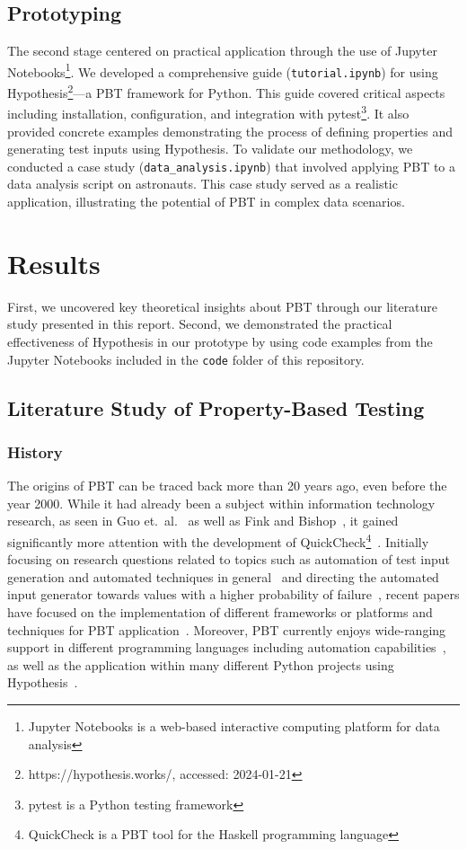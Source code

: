 \documentclass[runningheads]{llncs}
\begin{document}
\subsection{Prototyping}
The second stage centered on practical application through the use of Jupyter Notebooks\footnote{Jupyter Notebooks is a web-based interactive computing platform for data analysis}. We developed a comprehensive guide (\texttt{tutorial.ipynb}) for using Hypothesis\footnote{https://hypothesis.works/, accessed: 2024-01-21}---a PBT framework for Python. This guide covered critical aspects including installation, configuration, and integration with pytest\footnote{pytest is a Python testing framework}. It also provided concrete examples demonstrating the process of defining properties and generating test inputs using Hypothesis. To validate our methodology, we conducted a case study (\texttt{data\_analysis.ipynb}) that involved applying PBT to a data analysis script on astronauts. This case study served as a realistic application, illustrating the potential of PBT in complex data scenarios.

\section{Results}
First, we uncovered key theoretical insights about PBT through our literature study presented in this report. Second, we demonstrated the practical effectiveness of Hypothesis in our prototype by using code examples from the Jupyter Notebooks included in the \texttt{code} folder of this repository.

\subsection{Literature Study of Property-Based Testing}
\subsubsection{History}
The origins of PBT can be traced back more than 20 years ago, even before the year 2000. While it had already been a subject within information technology research, as seen in Guo et.~al.~\cite{Guo1999} as well as Fink and Bishop~\cite{Fink1997}, it gained significantly more attention with the development of QuickCheck\footnote{QuickCheck is a PBT tool for the Haskell programming language}~\cite{Shi2023,Guo1999,Fink1997,MacIver2019,Honarvar2020}. Initially focusing on research questions related to topics such as automation of test input generation and automated techniques in general~\cite{Fink1997} and directing the automated input generator towards values with a higher probability of failure~\cite{Loescher2017}, recent papers have focused on the implementation of different frameworks or platforms and techniques for PBT application~\cite{Padhye2019,Honarvar2020,Shi2023,Corgozinho2023}. Moreover, PBT currently enjoys wide-ranging support in different programming languages including automation capabilities~\cite{Chen2022,Padhye2019,Honarvar2020,ElazarMittelman2023,Shi2023}, as well as the application within many different Python projects using Hypothesis~\cite{Corgozinho2023}.
\end{document}
